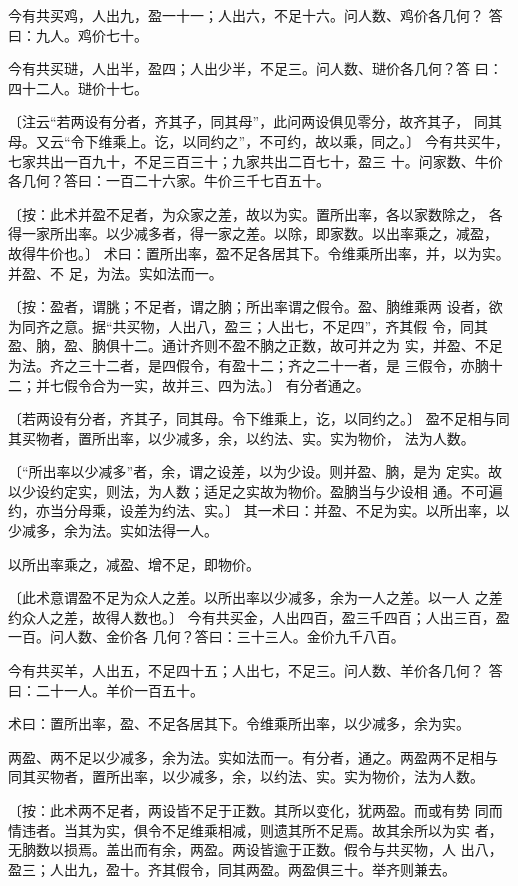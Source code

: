\documentclass[12pt,UTF8]{ctexbook}
\begin{document}
今有共买鸡，人出九，盈一十一；人出六，不足十六。问人数、鸡价各几何？ 答曰：九人。鸡价七十。

今有共买琎，人出半，盈四；人出少半，不足三。问人数、琎价各几何？答 曰：四十二人。琎价十七。

〔注云“若两设有分者，齐其子，同其母”，此问两设俱见零分，故齐其子， 同其母。又云“令下维乘上。讫，以同约之”，不可约，故以乘，同之。〕 今有共买牛，七家共出一百九十，不足三百三十；九家共出二百七十，盈三 十。问家数、牛价各几何？答曰：一百二十六家。牛价三千七百五十。

〔按：此术并盈不足者，为众家之差，故以为实。置所出率，各以家数除之， 各得一家所出率。以少减多者，得一家之差。以除，即家数。以出率乘之，减盈， 故得牛价也。〕 术曰：置所出率，盈不足各居其下。令维乘所出率，并，以为实。并盈、不 足，为法。实如法而一。

〔按：盈者，谓朓；不足者，谓之朒；所出率谓之假令。盈、朒维乘两 设者，欲为同齐之意。据“共买物，人出八，盈三；人出七，不足四”，齐其假 令，同其盈、朒，盈、朒俱十二。通计齐则不盈不朒之正数，故可并之为 实，并盈、不足为法。齐之三十二者，是四假令，有盈十二；齐之二十一者，是 三假令，亦朒十二；并七假令合为一实，故并三、四为法。〕 有分者通之。

〔若两设有分者，齐其子，同其母。令下维乘上，讫，以同约之。〕 盈不足相与同其买物者，置所出率，以少减多，余，以约法、实。实为物价， 法为人数。

〔“所出率以少减多”者，余，谓之设差，以为少设。则并盈、朒，是为 定实。故以少设约定实，则法，为人数；适足之实故为物价。盈朒当与少设相 通。不可遍约，亦当分母乘，设差为约法、实。〕 其一术曰：并盈、不足为实。以所出率，以少减多，余为法。实如法得一人。

以所出率乘之，减盈、增不足，即物价。

〔此术意谓盈不足为众人之差。以所出率以少减多，余为一人之差。以一人 之差约众人之差，故得人数也。〕 今有共买金，人出四百，盈三千四百；人出三百，盈一百。问人数、金价各 几何？答曰：三十三人。金价九千八百。

今有共买羊，人出五，不足四十五；人出七，不足三。问人数、羊价各几何？ 答曰：二十一人。羊价一百五十。

术曰：置所出率，盈、不足各居其下。令维乘所出率，以少减多，余为实。

两盈、两不足以少减多，余为法。实如法而一。有分者，通之。两盈两不足相与 同其买物者，置所出率，以少减多，余，以约法、实。实为物价，法为人数。

〔按：此术两不足者，两设皆不足于正数。其所以变化，犹两盈。而或有势 同而情违者。当其为实，俱令不足维乘相减，则遗其所不足焉。故其余所以为实 者，无朒数以损焉。盖出而有余，两盈。两设皆逾于正数。假令与共买物，人 出八，盈三；人出九，盈十。齐其假令，同其两盈。两盈俱三十。举齐则兼去。
\end{document}
